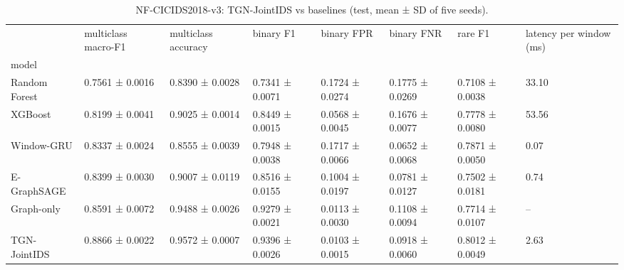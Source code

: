 \begin{table}
\caption{NF-CICIDS2018-v3: TGN-JointIDS vs baselines (test, mean ± SD of five seeds).}
\label{tab:baselines_nf_cicids2018_v3}
\begin{tabular}{llllllll}
\toprule
 & multiclass macro-F1 & multiclass accuracy & binary F1 & binary FPR & binary FNR & rare F1 & latency per window (ms) \\
model &  &  &  &  &  &  &  \\
\midrule
Random Forest & 0.7561 ± 0.0016 & 0.8390 ± 0.0028 & 0.7341 ± 0.0071 & 0.1724 ± 0.0274 & 0.1775 ± 0.0269 & 0.7108 ± 0.0038 & 33.10 \\
XGBoost & 0.8199 ± 0.0041 & 0.9025 ± 0.0014 & 0.8449 ± 0.0015 & 0.0568 ± 0.0045 & 0.1676 ± 0.0077 & 0.7778 ± 0.0080 & 53.56 \\
Window-GRU & 0.8337 ± 0.0024 & 0.8555 ± 0.0039 & 0.7948 ± 0.0038 & 0.1717 ± 0.0066 & 0.0652 ± 0.0068 & 0.7871 ± 0.0050 & 0.07 \\
E-GraphSAGE & 0.8399 ± 0.0030 & 0.9007 ± 0.0119 & 0.8516 ± 0.0155 & 0.1004 ± 0.0197 & 0.0781 ± 0.0127 & 0.7502 ± 0.0181 & 0.74 \\
Graph-only & 0.8591 ± 0.0072 & 0.9488 ± 0.0026 & 0.9279 ± 0.0021 & 0.0113 ± 0.0030 & 0.1108 ± 0.0094 & 0.7714 ± 0.0107 & – \\
TGN-JointIDS & 0.8866 ± 0.0022 & 0.9572 ± 0.0007 & 0.9396 ± 0.0026 & 0.0103 ± 0.0015 & 0.0918 ± 0.0060 & 0.8012 ± 0.0049 & 2.63 \\
\bottomrule
\end{tabular}
\end{table}
